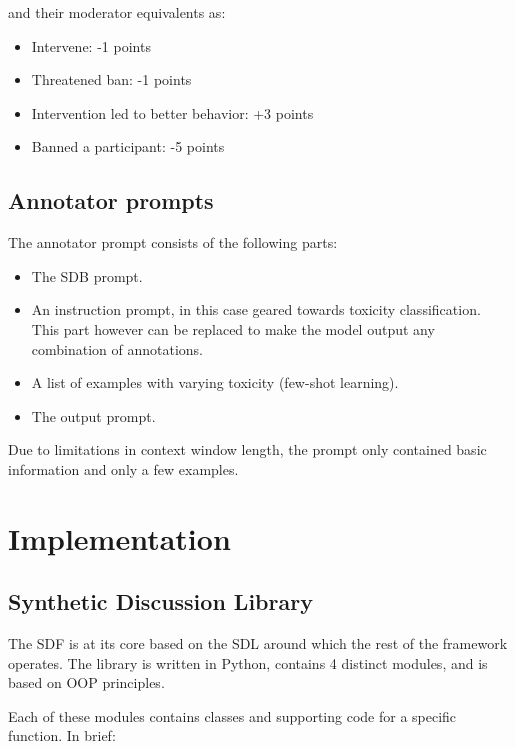 and their moderator equivalents as:
\begin{itemize}
	\item Intervene: -1 points
	\item Threatened ban: -1 points
	\item Intervention led to better behavior: +3 points
	\item Banned a participant: -5 points
\end{itemize}


\subsection{Annotator prompts}
\label{ssec:system:annotator-prompt}

The annotator prompt consists of the following parts:

\begin{itemize}
	\item The \ac{SDB} prompt.
	
	\item An instruction prompt, in this case geared towards toxicity classification. This part however can be replaced to make the model output any combination of annotations.
	
	\item A list of examples with varying toxicity (few-shot learning).
	
	\item The output prompt.
\end{itemize}

Due to limitations in context window length, the prompt only contained basic information and only a few examples.

\section{Implementation}
\label{sec:system:implementation}

\subsection{Synthetic Discussion Library}
\label{ssec:system:library}

The \ac{SDF} is at its core based on the \ac{SDL} around which the rest of the framework operates. The library is written in Python, contains 4 distinct modules, and is based on \ac{OOP} principles.

Each of these modules contains classes and supporting code for a specific function. In brief:

